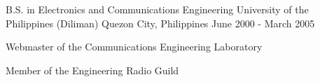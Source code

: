 

\begin{cventries}

  \cventry
    {B.S. in Electronics and Communications Engineering} %
    {University of the Philippines (Diliman)} %
    {Quezon City, Philippines} %
    {June 2000 - March 2005} %
    {
      \begin{cvitems} %
        \item {Webmaster of the Communications Engineering Laboratory}
        \item {Member of the Engineering Radio Guild}
      \end{cvitems}
    }

\end{cventries}
